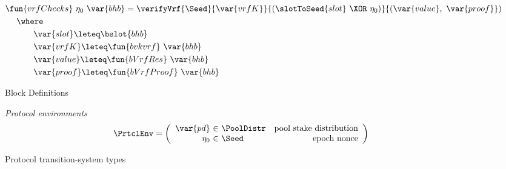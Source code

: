 \begin{figure*}[htb]
\begin{align*}
      & \fun{vrfChecks}~\eta_0~\var{bhb} =
          \verifyVrf{\Seed}{\var{vrfK}}{(\slotToSeed{slot}~\XOR~\eta_0)}{(\var{value},~\var{proof}}) \\
      & ~~~~\where \\
      & ~~~~~~~~~~\var{slot} \leteq \bslot{bhb} \\
      & ~~~~~~~~~~\var{vrfK} \leteq \fun{bvkvrf}~\var{bhb} \\
      & ~~~~~~~~~~\var{value} \leteq \fun{bVrfRes}~\var{bhb} \\
      & ~~~~~~~~~~\var{proof} \leteq \fun{bVrfProof}~\var{bhb} \\
  \end{align*}
  \caption{Block Definitions}
  \label{fig:defs:blocks}
\end{figure*}


\begin{figure}
  \emph{Protocol environments}
  \begin{equation*}
    \PrtclEnv =
    \left(
      \begin{array}{r@{~\in~}lr}
        \var{pd} & \PoolDistr & \text{pool stake distribution} \\
        \eta_0 & \Seed & \text{epoch nonce} \\
      \end{array}
    \right)
  \end{equation*}
  \caption{Protocol transition-system types}
  \label{fig:ts-types:prtcl}
\end{figure}

